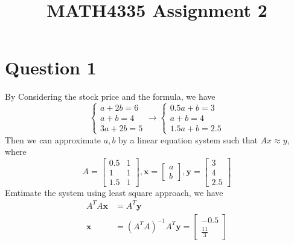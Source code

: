 \documentclass[12pt]{article}
\begin{document}
  
  \title{MATH4335 Assignment 2}
  \section*{Question 1}
  By Considering the stock price and the formula, we have
  $$
  \begin{cases}
    a+2b = 6\\
    a+b=4\\
    3a+2b=5
  \end{cases}
  \rightarrow
  \begin{cases}
    0.5a+b = 3\\
    a+b=4\\
    1.5a+b=2.5
  \end{cases}
  $$
  Then we can approximate $a,b$ by a linear equation system such that $Ax\approx y$, where
  $$
  A = \begin{bmatrix}
    0.5&1\\1&1\\1.5&1
  \end{bmatrix}, \bm{x} = \begin{bmatrix}a\\b\end{bmatrix}, \bm{y} = \begin{bmatrix} 3\\4\\2.5 \end{bmatrix}
  $$
  Emtimate the system using least square approach, we have
  $$
  \begin{aligned}
    A^TA\bm{x} &= A^T\bm{y}\\
  \bm{x} &= (A^TA)^{-1}A^T\bm{y} = 
\begin{bmatrix}
-0.5\\
\frac{11}{3}
\end{bmatrix}
  \end{aligned}
  $$
\end{document}
